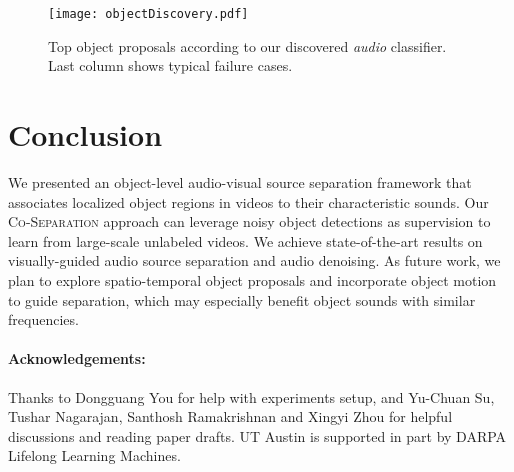 \documentclass[10pt,twocolumn,letterpaper]{article}
\begin{document}
\begin{figure}[t]
	\centering
	\texttt{[image: objectDiscovery.pdf]}
	\caption{Top object proposals according to our discovered \emph{audio} classifier. Last column shows typical failure cases.}
	\label{fig:objectDiscovery}
	\vspace*{-0.1in}
\end{figure} \vspace*{-0.05in}
\section{Conclusion}

 We presented an object-level audio-visual source separation framework that associates localized object regions in videos to their characteristic sounds. Our \textsc{Co-Separation} approach can leverage noisy object detections as supervision to learn from large-scale unlabeled videos. We achieve state-of-the-art results on visually-guided audio source separation and audio denoising. As future work, we plan to explore spatio-temporal object proposals and incorporate object motion to guide separation, which may especially benefit object sounds with similar frequencies.
  

\vspace*{-0.1in}
\footnotesize
\paragraph{Acknowledgements:} Thanks to Dongguang You for help with experiments setup, and Yu-Chuan Su, Tushar Nagarajan, Santhosh Ramakrishnan and Xingyi Zhou for helpful discussions and reading paper drafts. UT Austin is supported in part by DARPA Lifelong Learning Machines.


{\small


}

\clearpage
\end{document}
